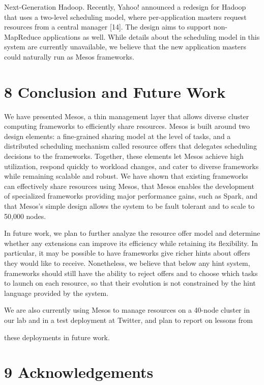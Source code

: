 \documentclass[
]{article}
\begin{document}
Next-Generation Hadoop. Recently, Yahoo! announced a redesign for Hadoop
that uses a two-level scheduling model, where per-application masters
request resources from a central manager {[}14{]}. The design aims to
support non-MapReduce applications as well. While details about the
scheduling model in this system are currently unavailable, we believe
that the new application masters could naturally run as Mesos
frameworks.

\section{8 Conclusion and Future Work}\label{conclusion-and-future-work}

We have presented Mesos, a thin management layer that allows diverse
cluster computing frameworks to efficiently share resources. Mesos is
built around two design elements: a fine-grained sharing model at the
level of tasks, and a distributed scheduling mechanism called resource
offers that delegates scheduling decisions to the frameworks. Together,
these elements let Mesos achieve high utilization, respond quickly to
workload changes, and cater to diverse frameworks while remaining
scalable and robust. We have shown that existing frameworks can
effectively share resources using Mesos, that Mesos enables the
development of specialized frameworks providing major performance gains,
such as Spark, and that Mesos's simple design allows the system to be
fault tolerant and to scale to 50,000 nodes.

In future work, we plan to further analyze the resource offer model and
determine whether any extensions can improve its efficiency while
retaining its flexibility. In particular, it may be possible to have
frameworks give richer hints about offers they would like to receive.
Nonetheless, we believe that below any hint system, frameworks should
still have the ability to reject offers and to choose which tasks to
launch on each resource, so that their evolution is not constrained by
the hint language provided by the system.

We are also currently using Mesos to manage resources on a 40-node
cluster in our lab and in a test deployment at Twitter, and plan to
report on lessons from

these deployments in future work.

\section{9 Acknowledgements}\label{acknowledgements}
\end{document}
